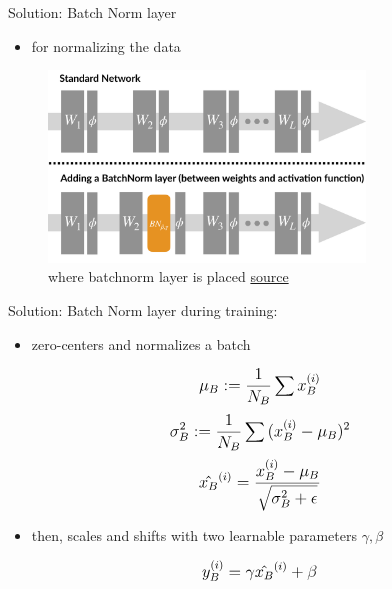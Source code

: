 \begin{frame}{Solution: Batch Norm layer}
	\begin{itemize}
		\item for normalizing the data
	\end{itemize}
	\begin{figure}[H]
		\centering
		\includegraphics[width=0.75\textwidth]{Figs/section_4/batchnorm_2.jpg}
		\caption{where batchnorm layer is placed \href{https://gradientscience.org/batchnorm/}{source}}
	\end{figure}
\end{frame}
\begin{frame}{Solution: Batch Norm layer}
    during training:
    \begin{itemize}
    	\item zero-centers and normalizes a batch
    \end{itemize}
	\begin{equation*}
		\mathlarger{
			\mu_B := \frac{1}{N_B} \sum{x_B^{(i)}}
		}
	\end{equation*}
	\begin{equation*}
		\mathlarger{
			\sigma_B^2 := \frac{1}{N_B} \sum{(x_B^{(i)} - \mu_B)^2}
		}
	\end{equation*}
	\begin{equation*}
		\mathlarger{
			\hat{x_B}^{(i)} = \frac{x_B^{(i)} - \mu_B}{\sqrt{\sigma^2_B + \epsilon}}
		}
	\end{equation*}
	\begin{itemize}
		\item then, scales and shifts with two learnable parameters $\gamma, \beta$
	\end{itemize}
	\begin{equation*}
		\mathlarger{
		y_B^{(i)} = \gamma \hat{x_B}^{(i)} + \beta	
	}
	\end{equation*}
\end{frame}
